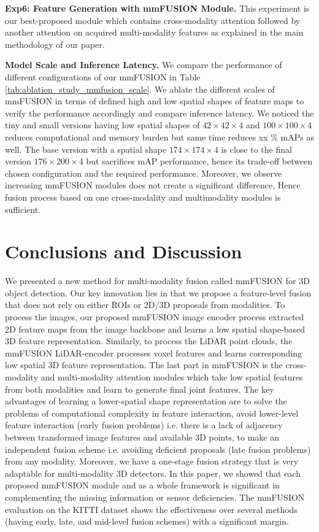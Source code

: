 \documentclass[10pt,twocolumn,letterpaper]{article}
\begin{document}
\textbf{Exp6: Feature Generation with mmFUSION Module.}
%
This experiment is our best-proposed module which contains cross-modality attention followed by another attention on acquired multi-modality features as explained in the main methodology of our paper. 




\textbf{Model Scale and Inference Latency.}
We compare the performance of different configurations of our mmFUSION in Table \ref{tab:ablation_study_mmfusion_scale}. We ablate the different scales of mmFUSION in terms of defined high and low spatial shapes of feature maps to verify the performance accordingly and compare inference latency. We noticed the tiny and small versions having low spatial shapes of $42\times42\times4$ and $100\times100\times4$ reduces computational and memory burden but same time reduces xx \% mAPs as well. The base version with a spatial shape $174\times174\times4$ is close to the final version $176\times200\times4$ but sacrifices mAP performance, hence its trade-off between chosen configuration and the required performance. Moreover, we observe increasing mmFUSION modules does not create a significant difference, Hence fusion process based on one cross-modality and multimodality modules is sufficient.


\section{Conclusions and Discussion}
We presented a new method for multi-modality fusion called mmFUSION for 3D object detection. Our key innovation lies in that we propose a feature-level fusion that does not rely on either ROIs or 2D/3D proposals from modalities. To process the images, our proposed mmFUSION image encoder process extracted 2D feature maps from the image backbone and learns a low spatial shape-based 3D feature representation. Similarly, to process the LiDAR point clouds, the mmFUSION LiDAR-encoder processes voxel features and learns corresponding low spatial 3D feature representation. The last part in mmFUSION is the cross-modality and multi-modality attention modules which take low spatial features from both modalities and learn to generate final joint features.  The key advantages of learning a lower-spatial shape representation are to solve the problems of computational complexity in feature interaction, avoid lower-level feature interaction (early fusion problems) i.e. there is a lack of adjacency between transformed image features and available 3D points, to make an independent fusion scheme i.e. avoiding deficient proposals (late fusion problems) from any modality. Moreover, we have a one-stage fusion strategy that is very adaptable for multi-modality 3D detectors. 
In this paper, we showed that each proposed mmFUSION module and as a whole framework is significant in complementing the missing information or sensor deficiencies. The mmFUSION evaluation on the KITTI dataset shows the effectiveness over several methods (having early, late, and mid-level fusion schemes) with a significant margin. 
\end{document}
